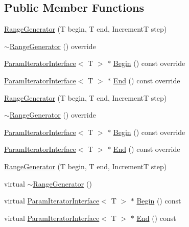 \subsection*{Public Member Functions}
\begin{DoxyCompactItemize}
\item 
\mbox{\hyperlink{classtesting_1_1internal_1_1_range_generator_a5b3b83223b9cada3569bcee729e0fdf3}{Range\+Generator}} (T begin, T end, IncrementT step)
\item 
\mbox{\hyperlink{classtesting_1_1internal_1_1_range_generator_a72f6e6f65f1dd3f86672f6ed47df74ef}{$\sim$\+Range\+Generator}} () override
\item 
\mbox{\hyperlink{classtesting_1_1internal_1_1_param_iterator_interface}{Param\+Iterator\+Interface}}$<$ T $>$ $\ast$ \mbox{\hyperlink{classtesting_1_1internal_1_1_range_generator_a502913fbcf14e89d5765dfb44f3c1295}{Begin}} () const override
\item 
\mbox{\hyperlink{classtesting_1_1internal_1_1_param_iterator_interface}{Param\+Iterator\+Interface}}$<$ T $>$ $\ast$ \mbox{\hyperlink{classtesting_1_1internal_1_1_range_generator_ac112ca69567b9c47bf14554e0473e1e2}{End}} () const override
\item 
\mbox{\hyperlink{classtesting_1_1internal_1_1_range_generator_a5b3b83223b9cada3569bcee729e0fdf3}{Range\+Generator}} (T begin, T end, IncrementT step)
\item 
\mbox{\hyperlink{classtesting_1_1internal_1_1_range_generator_a72f6e6f65f1dd3f86672f6ed47df74ef}{$\sim$\+Range\+Generator}} () override
\item 
\mbox{\hyperlink{classtesting_1_1internal_1_1_param_iterator_interface}{Param\+Iterator\+Interface}}$<$ T $>$ $\ast$ \mbox{\hyperlink{classtesting_1_1internal_1_1_range_generator_a502913fbcf14e89d5765dfb44f3c1295}{Begin}} () const override
\item 
\mbox{\hyperlink{classtesting_1_1internal_1_1_param_iterator_interface}{Param\+Iterator\+Interface}}$<$ T $>$ $\ast$ \mbox{\hyperlink{classtesting_1_1internal_1_1_range_generator_ac112ca69567b9c47bf14554e0473e1e2}{End}} () const override
\item 
\mbox{\hyperlink{classtesting_1_1internal_1_1_range_generator_a5b3b83223b9cada3569bcee729e0fdf3}{Range\+Generator}} (T begin, T end, IncrementT step)
\item 
virtual \mbox{\hyperlink{classtesting_1_1internal_1_1_range_generator_a680b80b06f471b5f93d8433609017021}{$\sim$\+Range\+Generator}} ()
\item 
virtual \mbox{\hyperlink{classtesting_1_1internal_1_1_param_iterator_interface}{Param\+Iterator\+Interface}}$<$ T $>$ $\ast$ \mbox{\hyperlink{classtesting_1_1internal_1_1_range_generator_ae68b59f9348ecf93e0947545a2424765}{Begin}} () const
\item 
virtual \mbox{\hyperlink{classtesting_1_1internal_1_1_param_iterator_interface}{Param\+Iterator\+Interface}}$<$ T $>$ $\ast$ \mbox{\hyperlink{classtesting_1_1internal_1_1_range_generator_a8d2acbb733791a14df6e7bd3754e9003}{End}} () const
\end{DoxyCompactItemize}
